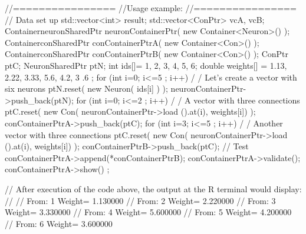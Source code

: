 \begin{DoxyCode}
        //================
        //Usage example:
        //================
        // Data set up
                                std::vector<int> result;
                                std::vector<ConPtr> vcA, vcB;
                                ContainerneuronSharedPtr neuronContainerPtr( new 
      Container<Neuron>() );
                                ContainerconSharedPtr    conContainerPtrA( new 
      Container<Con>() );
                                ContainerconSharedPtr    conContainerPtrB( new 
      Container<Con>() );
                                ConPtr    ptC;
                                NeuronSharedPtr ptN;
                                int ids[]= {1, 2, 3, 4, 5, 6};
                                double weights[] = {1.13, 2.22, 3.33, 5.6, 4.2, 3
      .6 };
                                for (int i=0; i<=5 ; i++) {                             /
      / Let's create a vector with six neurons
                                        ptN.reset( new Neuron( ids[i] ) );
                                        neuronContainerPtr->push_back(ptN);
                                }
                                for (int i=0; i<=2 ; i++) {                             /
      / A vector with three connections
                                        ptC.reset( new Con( neuronContainerPtr->load
      ().at(i), weights[i]) );
                                        conContainerPtrA->push_back(ptC);
                                }
                                for (int i=3; i<=5 ; i++) {                             /
      / Another vector with three connections
                                        ptC.reset( new Con( neuronContainerPtr->load
      ().at(i), weights[i]) );
                                        conContainerPtrB->push_back(ptC);
                                }
        // Test
                                conContainerPtrA->append(*conContainerPtrB);
                                conContainerPtrA->validate();
                                conContainerPtrA->show() ;

        // After execution of the code above, the output at the R terminal would 
      display:
        //
        //  From:        1       Weight=         1.130000
        //      From:    2       Weight=         2.220000
        //      From:    3       Weight=         3.330000
        //      From:    4       Weight=         5.600000
        //      From:    5       Weight=         4.200000
        //      From:    6       Weight=         3.600000
\end{DoxyCode}


